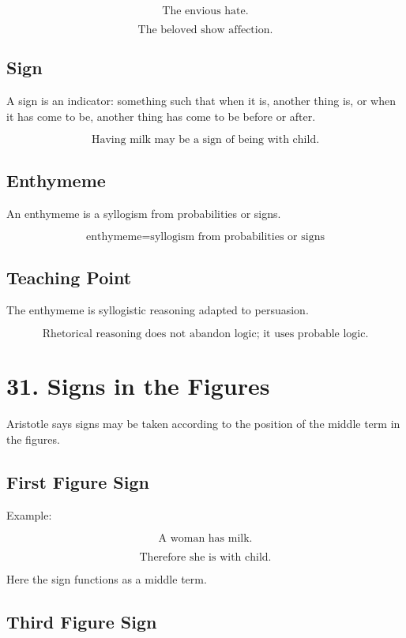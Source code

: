 \documentclass[12pt]{article}
\begin{document}
\[
\text{The envious hate.}
\]

\[
\text{The beloved show affection.}
\]

\subsection*{Sign}

A sign is an indicator: something such that when it is, another thing is, or
when it has come to be, another thing has come to be before or after.

\[
\text{Having milk may be a sign of being with child.}
\]

\subsection*{Enthymeme}

An enthymeme is a syllogism from probabilities or signs.

\[
\boxed{
\text{enthymeme} = \text{syllogism from probabilities or signs}
}
\]

\subsection*{Teaching Point}

The enthymeme is syllogistic reasoning adapted to persuasion.

\[
\boxed{
\text{Rhetorical reasoning does not abandon logic; it uses probable logic.}
}
\]

\section*{31. Signs in the Figures}

Aristotle says signs may be taken according to the position of the middle term
in the figures.

\subsection*{First Figure Sign}

Example:

\[
\text{A woman has milk.}
\]

\[
\text{Therefore she is with child.}
\]

Here the sign functions as a middle term.

\subsection*{Third Figure Sign}
\end{document}
